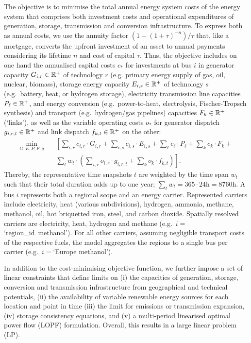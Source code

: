 The objective is to minimise the total annual energy system costs of the energy
system that comprises both investment costs and operational expenditures of
generation, storage, transmission and conversion infrastructure. To express both
as annual costs, we use the annuity factor $(1-(1+\tau)^{-n}) / \tau$ that, like
a mortgage, converts the upfront investment of an asset to annual payments
considering its lifetime $n$ and cost of capital $\tau$. Thus, the objective
includes on one hand the annualised capital costs $c_*$ for investments at bus
$i$ in generator capacity $G_{i,r}\in\mathbb{R}^+$ of technology $r$ (e.g. primary
energy supply of gas, oil, nuclear, biomass), storage energy capacity
$E_{i,s}\in\mathbb{R}^+$ of technology $s$ (e.g.~battery, heat, or hydrogen storage),
electricity transmission line capacities $P_{\ell}\in\mathbb{R}^+$, and energy
conversion (e.g.~power-to-heat, electrolysis, Fischer-Tropsch synthesis) and
transport (e.g.~hydrogen/gas pipelines) capacities $F_k\in\mathbb{R}^+$ (`links'), as
well as the variable operating costs $o_*$ for generator dispatch
$g_{i,r,t}\in\mathbb{R}^+$ and link dispatch $f_{k,t}\in\mathbb{R}^+$ on the other:
\begin{align}
  \label{eq:objective}
  \min_{G,E,P,F,g} \quad &\left[\sum_{i,r} c_{i,r}\cdot G_{i,r} + \sum_{i,s} c_{i,s}\cdot E_{i,s} + \sum_{\ell}c_{\ell}\cdot P_{\ell}+ \sum_{k}c_{k}\cdot F_k +\right. \\
  & \left.  \sum_{t} w_t \cdot \left( \sum_{i,r} o_{i,r} \cdot g_{i,r,t} + \sum_k o_k \cdot f_{k,t} \right) \right].
\end{align}
Thereby, the representative time snapshots $t$ are weighted by the time span
$w_t$ such that their total duration adds up to one year; \mbox{$\sum_{t}
w_t=365\cdot 24\text{h}=8760\text{h}$}. A bus $i$ represents both a regional
scope and an energy carrier. Represented carriers include electricity, heat
(various subdivisions), hydrogen, ammonia, methane, methanol, oil, hot
briquetted iron, steel, and carbon dioxide. Spatially resolved carriers are
electricity, heat, hydrogen and methane (e.g.~\mbox{$i=$`region\_id methanol'}).
For all other carriers, assuming negligible transport costs of the respective
fuels, the model aggregates the regions to a single bus per carrier
(e.g.~$i=$`Europe methanol').



In addition to the cost-minimising objective function, we further impose a set
of linear constraints that define limits on (i) the capacities of generation,
storage, conversion and transmission infrastructure from geographical and
technical potentials, (ii) the availability of variable renewable energy sources
for each location and point in time (iii) the limit for \co emissions or transmission expansion, (iv)
storage consistency equations, and (v) a multi-period linearised optimal power
flow (LOPF) formulation. Overall, this results in a large linear problem (LP).


